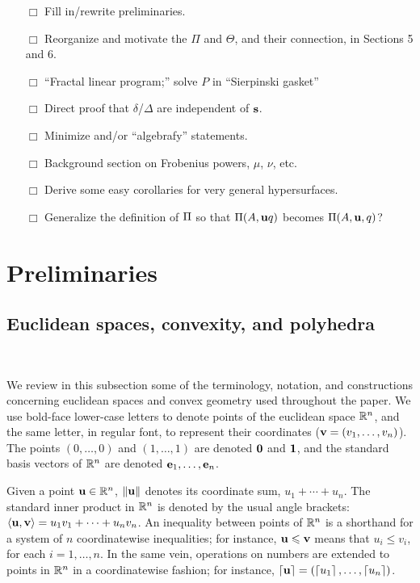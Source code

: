 \documentclass[11pt]{amsart}
\begin{document}
{\begin{enumerate}
{    I have a slight preference for starting at 0, but wouldn't mind changing it back, if you prefer. 
 }
 \item[$\Box$] Fill in/rewrite preliminaries.
 \item[$\Box$] Reorganize and motivate the $\Pi$ and $\Theta$, and their connection, in Sections 5 and 6.
 \item[$\Box$] ``Fractal linear program;'' solve $P$ in ``Sierpinski gasket''
 \item[$\Box$] Direct proof that $\delta$/$\Delta$ are independent of $\mathbf{s}$.
 \item[$\Box$] Minimize and/or ``algebrafy'' statements.
 \item[$\Box$] Background section on Frobenius powers, $\mu$, $\nu$, etc.
 \item[$\Box$] Derive some easy corollaries for very general hypersurfaces.
 \item[$\Box$] Generalize the definition of $\Pi$ so that $\Pi(A, \mathbf{u}q)$ becomes $\Pi(A, \mathbf{u}, q)$?  
\end{enumerate}
}

\newpage

\section{Preliminaries}

\subsection{Euclidean spaces, convexity, and polyhedra} 

\ 

We review in this subsection some of the terminology, notation, and constructions concerning euclidean spaces and convex geometry used throughout the paper.
We use bold-face lower-case letters to denote points of the euclidean space $\mathbb{R}^n$, and the same letter, in regular font, to represent their coordinates (\eg $\mathbf{v}=(v_1,\ldots,v_n)$).
The points $(0,\ldots,0)$ and $(1,\ldots,1)$ are denoted $\mathbf{0}$ and $\mathbf{1}$, and the standard basis vectors of $\mathbb{R}^n$ are denoted $\mathbf{e}_1,\ldots,\mathbf{e}_n$.

Given a point $\mathbf{u}\in \mathbb{R}^n$, $\| \mathbf{u} \|$ denotes its coordinate sum, $u_1+\cdots+u_n$.
The standard inner product in $\mathbb{R}^n$ is denoted by the usual angle brackets: $\langle \mathbf{u}, \mathbf{v} \rangle = u_1v_1 + \cdots + u_nv_n$.
An inequality between points of $\mathbb{R}^n$ is a shorthand for a system of $n$ coordinatewise inequalities; for instance, $\mathbf{u}\leqslant \mathbf{v}$ means that $u_i \le v_i$, for each $i=1,\ldots,n$.
In the same vein, operations on numbers are extended to points in $\mathbb{R}^n$ in a coordinatewise fashion; for instance, $\left\lceil \mathbf{u} \right\rceil=(\left\lceil u_1 \right\rceil,\ldots,\left\lceil u_n \right\rceil)$.
\end{document}
